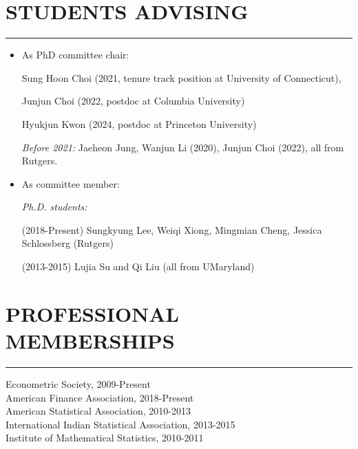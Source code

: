 \documentclass[11pt]{article}
\begin{document}






\section*{STUDENTS ADVISING}
\hrule
\hfill


\begin{itemize}
\item As PhD committee chair:

Sung Hoon Choi (2021, tenure track position at University of Connecticut), 

Junjun Choi (2022, postdoc at Columbia University)

Hyukjun Kwon (2024, postdoc at Princeton University)

 
 \textit{Before 2021:}  Jaeheon Jung, Wanjun Li (2020), Junjun Choi (2022),    all from Rutgers.   
 

\item  As committee member: 

\textit{Ph.D. students:}

(2018-Present)  Sungkyung Lee, Weiqi Xiong, Mingmian Cheng, Jessica Schlossberg (Rutgers)



(2013-2015)  Lujia Su and Qi Liu (all from UMaryland)

\end{itemize}



\section*{PROFESSIONAL MEMBERSHIPS}
\hrule
\hfill

Econometric Society, 2009-Present\\
American Finance Association, 2018-Present\\
American Statistical Association, 2010-2013\\
International Indian Statistical Association, 2013-2015\\
Institute of Mathematical Statistics, 2010-2011\\
\end{document}
